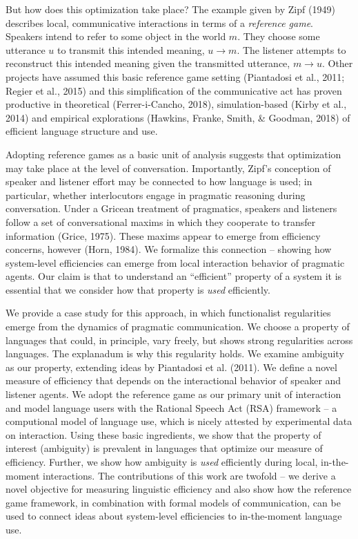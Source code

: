 \documentclass[10pt, letterpaper]{article}
\begin{document}
But how does this optimization take place? The example given by Zipf
(1949) describes local, communicative interactions in terms of a
\textit{reference game}. Speakers intend to refer to some object in the
world \(m\). They choose some utterance \(u\) to transmit this intended
meaning, \(u \rightarrow m\). The listener attempts to reconstruct this
intended meaning given the transmitted utterance, \(m \rightarrow u\).
Other projects have assumed this basic reference game setting
(Piantadosi et al., 2011; Regier et al., 2015) and this simplification
of the communicative act has proven productive in theoretical
(Ferrer-i-Cancho, 2018), simulation-based (Kirby et al., 2014) and
empirical explorations (Hawkins, Franke, Smith, \& Goodman, 2018) of
efficient language structure and use.\par

Adopting reference games as a basic unit of analysis suggests that
optimization may take place at the level of conversation. Importantly,
Zipf's conception of speaker and listener effort may be connected to how
language is used; in particular, whether interlocutors engage in
pragmatic reasoning during conversation. Under a Gricean treatment of
pragmatics, speakers and listeners follow a set of conversational maxims
in which they cooperate to transfer information (Grice, 1975). These
maxims appear to emerge from efficiency concerns, however (Horn, 1984).
We formalize this connection -- showing how system-level efficiencies
can emerge from local interaction behavior of pragmatic agents. Our
claim is that to understand an ``efficient'' property of a system it is
essential that we consider how that property is \emph{used}
efficiently.\par

We provide a case study for this approach, in which functionalist
regularities emerge from the dynamics of pragmatic communication. We
choose a property of languages that could, in principle, vary freely,
but shows strong regularities across languages. The explanadum is why
this regularity holds. We examine ambiguity as our property, extending
ideas by Piantadosi et al. (2011). We define a novel measure of
efficiency that depends on the interactional behavior of speaker and
listener agents. We adopt the reference game as our primary unit of
interaction and model language users with the Rational Speech Act (RSA)
framework -- a computional model of language use, which is nicely
attested by experimental data on interaction. Using these basic
ingredients, we show that the property of interest (ambiguity) is
prevalent in languages that optimize our measure of efficiency. Further,
we show how ambiguity is \textit{used} efficiently during local,
in-the-moment interactions. The contributions of this work are twofold
-- we derive a novel objective for measuring linguistic efficiency and
also show how the reference game framework, in combination with formal
models of communication, can be used to connect ideas about system-level
efficiencies to in-the-moment language use.\par
\end{document}
